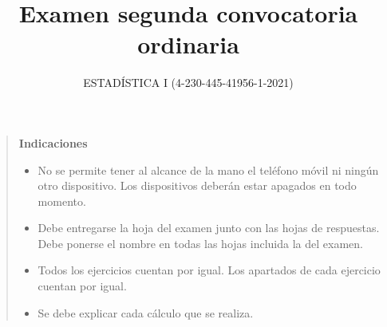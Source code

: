 \documentclass[]{article}
\title{Examen segunda convocatoria ordinaria}
\author{ESTADÍSTICA I (4-230-445-41956-1-2021)}
\date{}
\theoremstyle{plain}
\theoremstyle{definition}
\theoremstyle{definition} %
\begin{document}
\maketitle

\begin{quotation}
  \textbf{Indicaciones}
  \begin{itemize}
    \item No se permite tener al alcance de la mano el teléfono móvil ni ningún otro dispositivo. Los dispositivos deberán estar apagados en todo momento.
    \item Debe entregarse la hoja del examen junto con las hojas de respuestas. Debe ponerse el nombre en todas las hojas incluida la del examen.
    \item Todos los ejercicios cuentan por igual. Los apartados de cada ejercicio cuentan por igual.
    \item Se debe explicar cada cálculo que se realiza.
  \end{itemize}
\end{quotation}
\end{document}
